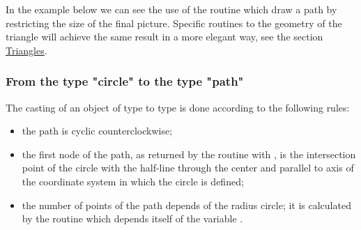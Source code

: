 \documentclass[pdftex]{article}
\begin{document}
%
In the example below we can see the use of the routine 
which draw a path by restricting the size of the final picture.
Specific routines to the geometry of the triangle will achieve the
same result in a more elegant way, see the section
\href{#section.triangle}{Triangles}.

\subsubsection{From the type "circle" to the type "path"}
The casting of an object of type  to type 
is done according to the following rules:
\begin{itemize}
\item the path is cyclic counterclockwise;
\item the first node of the path, as returned by the routine
  with , is the intersection point of the circle with the
  half-line through the center and parallel to axis of the coordinate
  system in which the circle is defined;
\item the number of points of the path depends of the radius circle; it
  is calculated by the routine\linebreak
  which depends itself of the variable
  .
\end{itemize}
\end{document}
